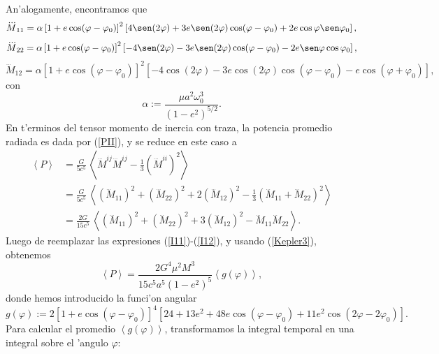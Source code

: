 An'alogamente, encontramos que
\begin{equation}\label{I11}
\dddot{M}_{11}=\alpha\left[1+e\cos(\varphi-\varphi_0)\right]^2 \left[4\sen(2\varphi)+3e\sen(2\varphi)\cos(\varphi-\varphi_0)
+2e\cos\varphi\sen\varphi_0\right],
\end{equation}
\begin{equation}\label{I22}
\dddot{M}_{22}=\alpha\left[1+e\cos(\varphi-\varphi_0)\right]^2 \left[-4\sen(2\varphi)-3e\sen(2\varphi)\cos(\varphi-\varphi_0)
-2e\sen\varphi\cos\varphi_0\right],
\end{equation}
\begin{equation}\label{I12}
\dddot{M}_{12}=\alpha\left[1+e\cos(\varphi-\varphi_0)\right]^2 \left[-4\cos(2\varphi)-3e\cos(2\varphi)\cos(\varphi-\varphi_0)
-e\cos(\varphi+\varphi_0)\right],
\end{equation}
con
\begin{equation}
\alpha:=\frac{\mu a^2\omega_0^3}{\left(1-e^2\right)^{5/2}}.
\end{equation}
En t'erminos del tensor momento de inercia con traza, la potencia promedio radiada es dada por (\ref{PII}), y se reduce en este caso a
\begin{align}
\left\langle P\right\rangle &=\frac{G}{5c^5}\, \left\langle \dddot{M}^{ij}\dddot{M}^{ij}-\frac{1}{3}\left(\dddot{M}^{ii}\right)^2\right\rangle \\
&=\frac{G}{5c^5}\, \left\langle \left(\dddot{M}_{11}\right)^2+ \left(\dddot{M}_{22}\right)^2+2 \left(\dddot{M}_{12}\right)^2-\frac{1}{3}\left(\dddot{M}_{11}+\dddot{M}_{22}\right)^2\right\rangle \\
&=\frac{2G}{15c^5}\, \left\langle \left(\dddot{M}_{11}\right)^2+ \left(\dddot{M}_{22}\right)^2+3\left(\dddot{M}_{12}\right)^2 -\dddot{M}_{11}\dddot{M}_{22}\right\rangle .
\end{align}
Luego de reemplazar las expresiones (\ref{I11})-(\ref{I12}), y usando (\ref{Kepler3}), obtenemos
\begin{equation}
\left\langle P\right\rangle = \frac{2G^4\mu^2M^3}{15c^5a^5\left(1-e^2\right)^{5}}\left\langle g(\varphi)\right\rangle ,
\end{equation}
donde hemos introducido la funci'on angular
\begin{equation}\label{Pphi}
g(\varphi):=2\left[1+e\cos(\varphi-\varphi_0)\right]^4
\left[24+13e^2+48e\cos(\varphi-\varphi_0) +11e^2\cos(2\varphi-2\varphi_0)\right].
\end{equation}
Para calcular el promedio $\left\langle g(\varphi)\right\rangle$, transformamos la integral temporal en una integral sobre el 'angulo $\varphi$:
